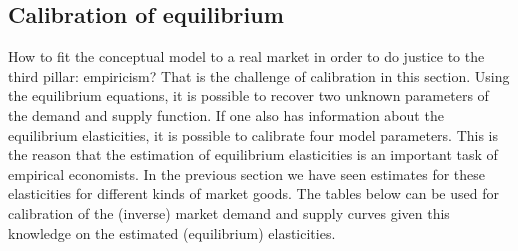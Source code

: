 \documentclass[
]{book}
\begin{document}
\hypertarget{calibration-of-equilibrium}{%
\subsection{Calibration of equilibrium}\label{calibration-of-equilibrium}}

How to fit the conceptual model to a real market in order to do justice to the third pillar: empiricism? That is the challenge of calibration in this section. Using the equilibrium equations, it is possible to recover two unknown parameters of the demand and supply function. If one also has information about the equilibrium elasticities, it is possible to calibrate four model parameters. This is the reason that the estimation of equilibrium elasticities is an important task of empirical economists. In the previous section we have seen estimates for these elasticities for different kinds of market goods. The tables below can be used for calibration of the (inverse) market demand and supply curves given this knowledge on the estimated (equilibrium) elasticities.
\end{document}
